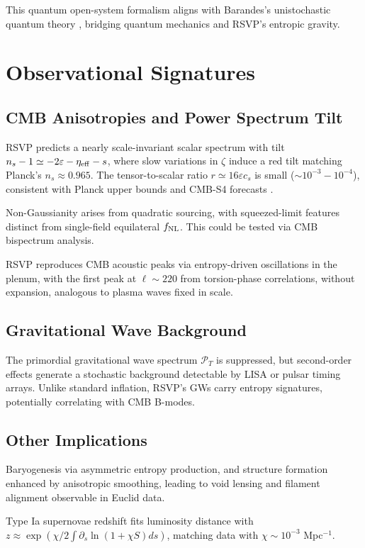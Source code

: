 \documentclass[12pt, a4paper, openany]{book}
\theoremstyle{definition}
\begin{document}
This quantum open-system formalism aligns with Barandes’s unistochastic quantum theory \citep{Barandes:2021}, bridging quantum mechanics and RSVP's entropic gravity.

\chapter{Observational Signatures}
\section{CMB Anisotropies and Power Spectrum Tilt}
RSVP predicts a nearly scale-invariant scalar spectrum with tilt $n_s - 1 \simeq -2\varepsilon - \eta_{\rm eff} - s$, where slow variations in $\zeta$ induce a red tilt matching Planck's $n_s \approx 0.965$. The tensor-to-scalar ratio $r \simeq 16 \varepsilon c_s$ is small ($\sim 10^{-3}-10^{-4}$), consistent with Planck upper bounds and CMB-S4 forecasts \citep{Abazajian:2016}.

Non-Gaussianity arises from quadratic sourcing, with squeezed-limit features distinct from single-field equilateral $f_{\rm NL}$. This could be tested via CMB bispectrum analysis.

RSVP reproduces CMB acoustic peaks via entropy-driven oscillations in the plenum, with the first peak at $\ell \sim 220$ from torsion-phase correlations, without expansion, analogous to plasma waves fixed in scale.

\section{Gravitational Wave Background}
The primordial gravitational wave spectrum $\mathcal{P}_T$ is suppressed, but second-order effects generate a stochastic background detectable by LISA or pulsar timing arrays. Unlike standard inflation, RSVP's GWs carry entropy signatures, potentially correlating with CMB B-modes.

\section{Other Implications}
Baryogenesis via asymmetric entropy production, and structure formation enhanced by anisotropic smoothing, leading to void lensing and filament alignment observable in Euclid data.

Type Ia supernovae redshift fits luminosity distance with $z \approx \exp \left( \chi / 2 \int \partial_s \ln(1 + \chi S) ds \right)$, matching data with $\chi \sim 10^{-3}$ Mpc$^{-1}$.
\end{document}
